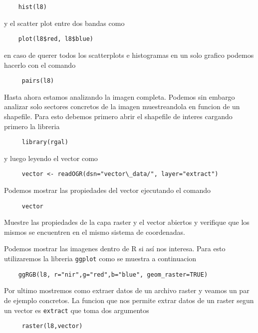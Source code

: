 \documentclass[a4paper]{article}
\begin{document}
 \begin{lstlisting}
    hist(l8) 
 \end{lstlisting}

 y el scatter plot entre dos bandas como

 \begin{lstlisting}
    plot(l8$red, l8$blue)    
 \end{lstlisting}

 en caso de querer todos los scatterplots e histogramas en un solo grafico
 podemos hacerlo con el comando

 \begin{lstlisting}
     pairs(l8)
 \end{lstlisting}

 Hasta ahora estamos analizando la imagen completa. Podemos sin embargo analizar
 solo sectores concretos de la imagen muestreandola en funcion de un shapefile.
 Para esto debemos primero abrir el shapefile de interes cargando primero la
 libreria

 \begin{lstlisting}
     library(rgal)
 \end{lstlisting}

 y luego leyendo el vector como

 \begin{lstlisting}
     vector <- readOGR(dsn="vector\_data/", layer="extract")
 \end{lstlisting}

 Podemos mostrar las propiedades del vector ejecutando el comando

 \begin{lstlisting}
     vector
 \end{lstlisting}

 \begin{act} 
    Muestre las propiedades de la capa raster y el vector abiertos y verifique
    que los mismos se encuentren en el mismo sistema de coordenadas.
 \end{act}

 Podemos mostrar las imagenes dentro de R si así nos interesa. Para esto
 utilizaremos la libreria \texttt{ggplot} como se muestra a continuacion

 \begin{lstlisting}
    ggRGB(l8, r="nir",g="red",b="blue", geom_raster=TRUE) 
 \end{lstlisting}

 Por ultimo mostremos como extraer datos de un archivo raster y veamos un par de
 ejemplo concretos. La funcion que nos permite extrar datos de un raster segun
 un vector es \texttt{extract} que toma dos argumentos
 \begin{lstlisting}
     raster(l8,vector)
 \end{lstlisting}
\end{document}
